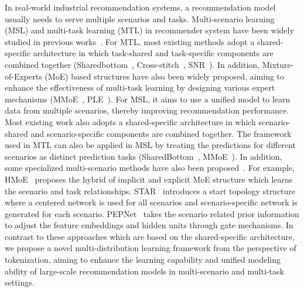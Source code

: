 In real-world industrial recommendation systems, a recommendation model usually needs to serve multiple scenarios and tasks.
Multi-scenario learning (MSL) and multi-task learning (MTL) in recommender system have been widely studied in previous works~\cite{sharedbottom,MMoE,Cross-Stitch,snr,PLE,HMoE,STAR,PEPNet,hinet,mmfi,yrr,MTL1}.
For MTL, most existing methods adopt a shared-specific architecture in which task-shared and task-specific components are combined together (\eg Sharedbottom~\cite{sharedbottom}, Cross-stitch~\cite{Cross-Stitch}, SNR~\cite{snr}).
In addition, Mixture-of-Experts (MoE) based structures have also been widely proposed, aiming to enhance the effectiveness of multi-task learning by designing various expert mechanisms (\eg MMoE~\cite{MMoE}, PLE~\cite{PLE}).
For MSL, it aims to use a unified model to learn data from multiple scenarios, thereby improving recommendation performance.
Most existing work also adopts a shared-specific architecture in which scenario-shared and scenario-specific components are combined together.
The framework used in MTL can also be applied in MSL by treating the predictions for different scenarios as distinct prediction tasks (\eg SharedBottom~\cite{sharedbottom}, MMoE~\cite{MMoE}).
In addition, some specialized multi-scenario methods have also been proposed~\cite{HMoE,STAR,PEPNet,hinet,mmfi,hc2,M2M,AdaSparse,SASS,TreeMS,SARNet,SAML}.
For example, HMoE~\cite{HMoE} proposes the hybrid of implicit and explicit MoE structure which learns the scenario and task relationships.
STAR~\cite{STAR} introduces a start topology structure where a centered network is used for all scenarios and scenario-specific network is generated for each scenario.
PEPNet~\cite{PEPNet} takes the scenario related prior information to adjust the feature embeddings and hidden units through gate mechanisms.
In contrast to these approaches which are based on the shared-specific architecture, we propose a novel multi-distribution learning framework from the perspective of tokenization, aiming to enhance the learning capability and unified modeling ability of large-scale recommendation models in multi-scenario and multi-task settings.
